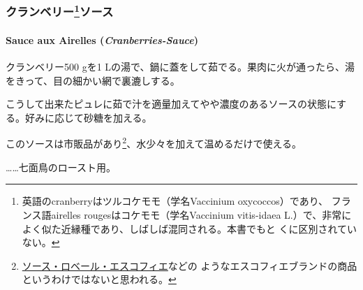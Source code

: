 \begin{recette}
\hypertarget{ux30afux30e9ux30f3ux30d9ux30eaux30fc1ux30bdux30fcux30b9}{%
\subsubsection[クランベリーソース]{\texorpdfstring{クランベリー\footnote{英語のcranberryはツルコケモモ（学名Vaccinium
  oxycoccos）であり、 フランス語airelles rougesはコケモモ（学名Vaccinium
  vitis-idaea
  L.）で、非常によく似た近縁種であり、しばしば混同される。本書でもと
  くに区別されていない。}ソース}{クランベリーソース}}\label{ux30afux30e9ux30f3ux30d9ux30eaux30fc1ux30bdux30fcux30b9}}

\hypertarget{cranberries-sauce}{%
\paragraph{\texorpdfstring{Sauce aux Airelles
(\emph{Cranberries-Sauce})}{Sauce aux Airelles (Cranberries-Sauce)}}\label{cranberries-sauce}}

  
  

クランベリー500 gを1
Lの湯で、鍋に蓋をして茹でる。果肉に火が通ったら、湯をきって、目の細かい網で裏漉しする。

こうして出来たピュレに茹で汁を適量加えてやや濃度のあるソースの状態にする。好みに応じて砂糖を加える。

このソースは市販品があり\footnote{\protect\hyperlink{sauce-robert-escoffier}{ソース・ロベール・エスコフィエ}などの
  ようなエスコフィエブランドの商品というわけではないと思われる。}、水少々を加えて温めるだけで使える。

\ldots{}\ldots{}七面鳥のロースト用。

\maeaki

\hypertarget{ux30a2ux30ebux30d0ux30fcux30c8ux30bdux30fcux30b9}{%
}
\end{recette}
